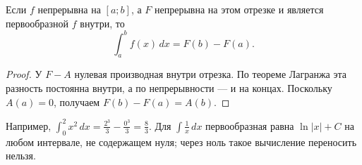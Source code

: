 \begin{theorem}\label{thm:legacy-c29-8}
Если \(f\) непрерывна на \([a;b]\), а \(F\) непрерывна на этом отрезке и является первообразной \(f\) внутри, то
\[
\int_a^b f(x)\,dx=F(b)-F(a).
\]
\end{theorem}
\begin{proof}
У \(F-A\) нулевая производная внутри отрезка. По теореме Лагранжа эта разность постоянна внутри, а по непрерывности — и на концах. Поскольку \(A(a)=0\), получаем \(F(b)-F(a)=A(b)\).
\end{proof}
Например, \(\int_0^2 x^2\,dx=\frac{2^3}3-\frac{0^3}3=\frac83\). Для \(\int\frac1x\,dx\) первообразная равна \(\ln|x|+C\) на любом интервале, не содержащем нуля; через ноль такое вычисление переносить нельзя.

